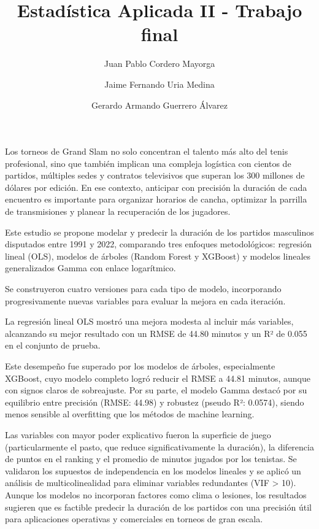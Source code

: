 \documentclass[
  letterpaper,
  DIV=11,
  numbers=noendperiod]{scrartcl}
\title{Estadística Aplicada II - Trabajo final}
\author{Juan Pablo Cordero Mayorga \and Jaime Fernando Uria
Medina \and Gerardo Armando Guerrero Álvarez}
\date{}
\begin{document}
\maketitle
\ifdefined\Shaded\renewenvironment{Shaded}{\begin{tcolorbox}[boxrule=0pt, interior hidden, borderline west={3pt}{0pt}{shadecolor}, frame hidden, breakable, sharp corners, enhanced]}{\end{tcolorbox}}\fi

Los torneos de Grand Slam no solo concentran el talento más alto del
tenis profesional, sino que también implican una compleja logística con
cientos de partidos, múltiples sedes y contratos televisivos que superan
los 300 millones de dólares por edición. En ese contexto, anticipar con
precisión la duración de cada encuentro es importante para organizar
horarios de cancha, optimizar la parrilla de transmisiones y planear la
recuperación de los jugadores.

Este estudio se propone modelar y predecir la duración de los partidos
masculinos disputados entre 1991 y 2022, comparando tres enfoques
metodológicos: regresión lineal (OLS), modelos de árboles (Random Forest
y XGBoost) y modelos lineales generalizados Gamma con enlace
logarítmico.

Se construyeron cuatro versiones para cada tipo de modelo, incorporando
progresivamente nuevas variables para evaluar la mejora en cada
iteración.

La regresión lineal OLS mostró una mejora modesta al incluir más
variables, alcanzando su mejor resultado con un RMSE de 44.80 minutos y
un R² de 0.055 en el conjunto de prueba.

Este desempeño fue superado por los modelos de árboles, especialmente
XGBoost, cuyo modelo completo logró reducir el RMSE a 44.81 minutos,
aunque con signos claros de sobreajuste. Por su parte, el modelo Gamma
destacó por su equilibrio entre precisión (RMSE: 44.98) y robustez
(pseudo R²: 0.0574), siendo menos sensible al overfitting que los
métodos de machine learning.

Las variables con mayor poder explicativo fueron la superficie de juego
(particularmente el pasto, que reduce significativamente la duración),
la diferencia de puntos en el ranking y el promedio de minutos jugados
por los tenistas. Se validaron los supuestos de independencia en los
modelos lineales y se aplicó un análisis de multicolinealidad para
eliminar variables redundantes (VIF \textgreater{} 10). Aunque los
modelos no incorporan factores como clima o lesiones, los resultados
sugieren que es factible predecir la duración de los partidos con una
precisión útil para aplicaciones operativas y comerciales en torneos de
gran escala.
\end{document}
